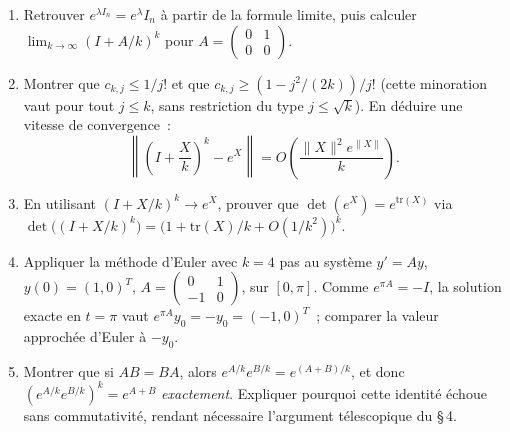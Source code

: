 \begin{mdframed}[style=exobar]
  \begin{enumerate}
    \item Retrouver $e^{\lambda I_n} = e^{\lambda} I_n$ à partir de la formule
          limite, puis calculer $\lim_{k\to\infty}{(I + A/k)}^k$ pour
          $A = \begin{pmatrix}0&1\\0&0\end{pmatrix}$.

    \item Montrer que $c_{k,j} \leq 1/j!$ et que $c_{k,j} \geq (1-j^2/(2k))/j!$
          (cette minoration vaut pour tout $j \leq k$, sans restriction du type
          $j \leq \sqrt{k}$). En déduire une vitesse de convergence~:
          \[
            \left\|\left(I+\frac{X}{k}\right)^{\!k} - e^X\right\|
            = O\!\left(\frac{\|X\|^2 e^{\|X\|}}{k}\right).
          \]

    \item En utilisant ${(I+X/k)}^k \to e^X$, prouver que
          $\det(e^X) = e^{\mathrm{tr}(X)}$ via
          $\det\!\bigl({(I+X/k)}^k\bigr) = \bigl(1 + \mathrm{tr}(X)/k
          + O(1/k^2)\bigr)^k$.

    \item Appliquer la méthode d'Euler avec $k=4$ pas au système
          $y'=Ay$, $y(0)={(1,0)}^T$, $A=\begin{pmatrix}0&1\\-1&0\end{pmatrix}$,
          sur $[0,\pi]$. Comme $e^{\pi A} = -I$, la solution exacte en $t=\pi$ vaut
          $e^{\pi A}y_0 = -y_0 = {(-1,0)}^T$~; comparer la valeur approchée d'Euler
          à $-y_0$.

    \item Montrer que si $AB = BA$, alors
          $e^{A/k}e^{B/k} = e^{(A+B)/k}$, et donc
          ${(e^{A/k}e^{B/k})}^k = e^{A+B}$ \emph{exactement}.
          Expliquer pourquoi cette identité échoue sans commutativité,
          rendant nécessaire l'argument télescopique du §\,4.
  \end{enumerate}
\end{mdframed}

